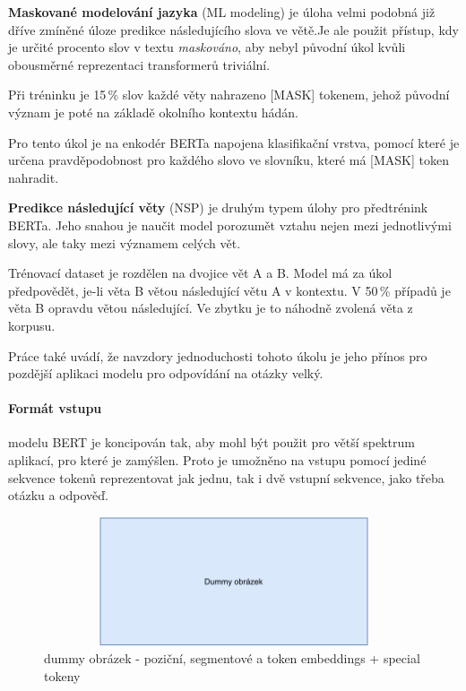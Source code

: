 \medskip
\textbf{Maskované modelování jazyka} (ML modeling) 
je úloha velmi podobná již dříve zmíněné úloze predikce následujícího slova ve větě.Je ale použit přístup, kdy je určité procento slov v textu \emph{maskováno}, aby nebyl původní úkol kvůli obousměrné reprezentaci transformerů triviální.\par
Při tréninku je 15\,\% slov každé věty nahrazeno [MASK] tokenem, jehož původní význam je poté na základě okolního kontextu hádán.\par
Pro tento úkol je na enkodér BERTa napojena klasifikační vrstva, pomocí které je určena pravděpodobnost pro každého slovo ve slovníku, které má [MASK] token nahradit.\par
\smallskip
\textbf{Predikce následující věty} (NSP) je druhým typem úlohy pro předtrénink BERTa. Jeho snahou je naučit model porozumět vztahu nejen mezi jednotlivými slovy, ale taky mezi významem celých vět.\par
Trénovací dataset je rozdělen na dvojice vět A a B. Model má za úkol předpovědět, je-li věta B větou následující větu A v kontextu. V 50\,\% případů je věta B opravdu větou následující. Ve zbytku je to náhodně zvolená věta z korpusu.\par
Práce \cite{BERT} také uvádí, že navzdory jednoduchosti tohoto úkolu je jeho přínos pro pozdější aplikaci modelu pro odpovídání na otázky velký.\par

\paragraph{Formát vstupu}
modelu BERT je koncipován tak, aby mohl být použit pro větší spektrum aplikací, pro které je zamýšlen. Proto je umožněno na vstupu pomocí jediné sekvence tokenů reprezentovat jak jednu, tak i dvě vstupní sekvence, jako třeba otázku a odpověď.

\begin{figure}[hbt]
	\centering
	\includegraphics[width=5.0in, height=1.5in]{obrazky/dummy_pic.pdf}
	\caption{dummy obrázek - poziční, segmentové a token embeddings + special tokeny}
	\label{bert_input}
\end{figure}


